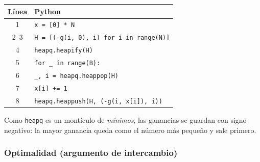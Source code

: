 \begin{center}
\begin{tabular}{cl}
\toprule
\rowcolor{uccielo} \textbf{Línea} & \textbf{Python} \\
\midrule
1 & \texttt{x = [0] * N} \\
2--3 & \texttt{H = [(-g(i, 0), i) for i in range(N)]} \\
4 & \texttt{heapq.heapify(H)} \\
5 & \texttt{for \_ in range(B):} \\
6 & \texttt{\_, i = heapq.heappop(H)} \\
7 & \texttt{x[i] += 1} \\
8 & \texttt{heapq.heappush(H, (-g(i, x[i]), i))} \\
\bottomrule
\end{tabular}
\end{center}

Como \texttt{heapq} es un montículo de \emph{mínimos}, las ganancias se guardan con signo negativo: la mayor ganancia queda como el número más pequeño y sale primero.

\subsubsection{Optimalidad (argumento de intercambio)}

